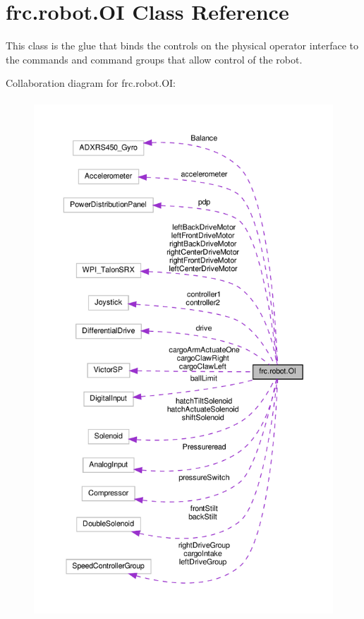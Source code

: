 \hypertarget{classfrc_1_1robot_1_1OI}{}\section{frc.\+robot.\+OI Class Reference}
\label{classfrc_1_1robot_1_1OI}


This class is the glue that binds the controls on the physical operator interface to the commands and command groups that allow control of the robot.  




Collaboration diagram for frc.\+robot.\+OI\+:\nopagebreak
\begin{figure}[H]
\begin{center}
\leavevmode
\includegraphics[height=550pt]{classfrc_1_1robot_1_1OI__coll__graph}
\end{center}
\end{figure}

